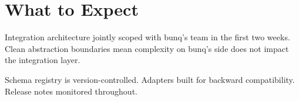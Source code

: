 
\newpage
\section{What to Expect}

\begin{description}[style=nextline, leftmargin=0pt, itemsep=4pt]
\item[\textsf{Core Banking Integration Complexity}] Integration architecture jointly scoped with bunq's team in the first two weeks. Clean abstraction boundaries mean complexity on bunq's side does not impact the integration layer.
\item[\textsf{Network Specification Changes}] Schema registry is version-controlled. Adapters built for backward compatibility. Release notes monitored throughout.
\end{description}
